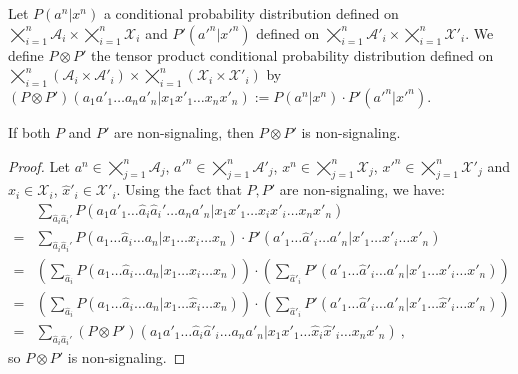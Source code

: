 \begin{definition}
  Let $P(a^n|x^n)$ a conditional probability distribution defined on $\bigtimes_{i=1}^n\mathcal{A}_i \times \bigtimes_{i=1}^n \mathcal{X}_i$ and $P'(a'^n|x'^n)$ defined on $\bigtimes_{i=1}^n\mathcal{A}'_i \times \bigtimes_{i=1}^n \mathcal{X}'_i$. We define $P \otimes P'$ the tensor product conditional probability distribution defined on $\bigtimes_{i=1}^n(\mathcal{A}_i \times \mathcal{A}'_i) \times \bigtimes_{i=1}^n (\mathcal{X}_i \times \mathcal{X}'_i)$ by $\left(P \otimes P'\right)(a_1a'_1\ldots a_na'_n|x_1x'_1\ldots x_nx'_n) := P(a^n|x^n) \cdot P'(a'^n|x'^n)$.
\end{definition}

\begin{proposition}
  \label{prop:NStensor}
  If both $P$ and $P'$ are non-signaling, then $P \otimes P'$ is non-signaling.
\end{proposition}
\begin{proof}
  Let $a^n \in \bigtimes_{j=1}^n\mathcal{A}_j$, $a'^n \in \bigtimes_{j=1}^n\mathcal{A}'_j$, $x^n \in \bigtimes_{j=1}^n \mathcal{X}_j$, $x'^n \in \bigtimes_{j=1}^n \mathcal{X}'_j$ and $\hat{x}_i \in \mathcal{X}_i$, $\hat{x}'_i \in \mathcal{X}'_i$. Using the fact that $P,P'$ are non-signaling, we have:
  \begin{equation}
    \begin{aligned}
      &\sum_{\hat{a}_i\hat{a}_i'}P(a_1a'_1\ldots \hat{a}_i\hat{a}_i' \ldots a_na'_n|x_1x'_1\ldots x_ix'_i \ldots x_nx'_n)\\
      = &\sum_{\hat{a}_i\hat{a}_i'}  P(a_1\ldots \hat{a}_i \ldots a_n|x_1\ldots x_i \ldots x_n) \cdot P'(a'_1\ldots \hat{a}'_i \ldots a'_n|x'_1\ldots x'_i \ldots x'_n)\\
      = &\left(\sum_{\hat{a}_i}  P(a_1\ldots \hat{a}_i \ldots a_n|x_1\ldots x_i \ldots x_n)\right) \cdot \left(\sum_{\hat{a}'_i}  P'(a'_1\ldots \hat{a}'_i \ldots a'_n|x'_1\ldots x'_i \ldots x'_n)\right)\\
      = &\left(\sum_{\hat{a}_i}  P(a_1\ldots \hat{a}_i \ldots a_n|x_1\ldots \hat{x}_i \ldots x_n)\right) \cdot \left(\sum_{\hat{a}'_i}  P'(a'_1\ldots \hat{a}'_i \ldots a'_n|x'_1\ldots \hat{x}'_i \ldots x'_n)\right)\\
      = &\sum_{\hat{a}_i\hat{a}_i'}\left(P \otimes P'\right)(a_1a'_1\ldots \hat{a}_i\hat{a}'_i \ldots a_na'_n|x_1x'_1\ldots \hat{x}_i\hat{x}'_i \ldots x_nx'_n) \ ,
    \end{aligned}
  \end{equation}
  so $P \otimes P'$ is non-signaling.
\end{proof}

